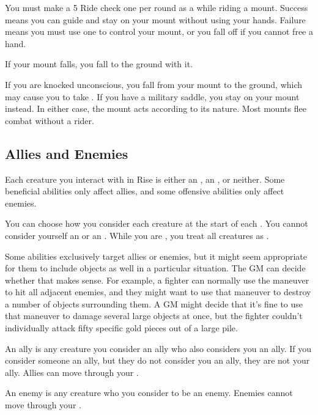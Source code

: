      You must make a  5 Ride check one per round as a  while riding a mount.
    Success means you can guide and stay on your mount without using your hands.
    Failure means you must use one  to control your mount, or you fall off if you cannot free a hand.

     If your mount falls, you fall to the ground with it.

     If you are knocked unconscious, you fall from your mount to the ground, which may cause you to take .
    If you have a military saddle, you stay on your mount instead.
    In either case, the mount acts according to its nature.
    Most mounts flee combat without a rider.

  \subsection{Allies and Enemies}\label{Allies and Enemies}
    Each creature you interact with in Rise is either an , an , or neither.
    Some beneficial abilities only affect allies, and some offensive abilities only affect enemies.

    You can choose how you consider each creature at the start of each .
    You cannot consider yourself an  or an .
    While you are \unconscious, you treat all creatures as .

    Some abilities exclusively target allies or enemies, but it might seem appropriate for them to include objects as well in a particular situation.
    The GM can decide whether that makes sense.
    For example, a fighter can normally use the  maneuver to hit all adjacent enemies, and they might want to use that maneuver to destroy a number of objects surrounding them.
    A GM might decide that it's fine to use that maneuver to damage several large objects at once, but the fighter couldn't individually attack fifty specific gold pieces out of a large pile.

     An ally is any creature you consider an ally who also considers you an ally.
    If you consider someone an ally, but they do not consider you an ally, they are not your ally.
    Allies can move through your .

     An enemy is any creature who you consider to be an enemy.
    Enemies cannot move through your .

